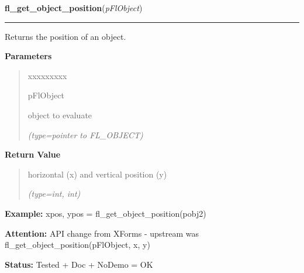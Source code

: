     \vspace{0.5ex}

\hspace{.8\funcindent}\begin{boxedminipage}{\funcwidth}

    \raggedright \textbf{fl\_get\_object\_position}(\textit{pFlObject})

    \vspace{-1.5ex}

    \rule{\textwidth}{0.5\fboxrule}
\setlength{\parskip}{2ex}
    Returns the position of an object.

\setlength{\parskip}{1ex}
      \textbf{Parameters}
      \vspace{-1ex}

      \begin{quote}
        \begin{Ventry}{xxxxxxxxx}

          \item[pFlObject]

          object to evaluate

            {\it (type=pointer to FL\_OBJECT)}

        \end{Ventry}

      \end{quote}

      \textbf{Return Value}
    \vspace{-1ex}

      \begin{quote}
      horizontal (x) and vertical position (y)

      {\it (type=int, int)}

      \end{quote}

\textbf{Example:} xpos, ypos = fl\_get\_object\_position(pobj2)



\textbf{Attention:} API change from XForms - upstream was fl\_get\_object\_position(pFlObject, 
x, y)



\textbf{Status:} Tested + Doc + NoDemo = OK



    \end{boxedminipage}

    \label{xformslib:flbasic:fl_get_object_bbox}

